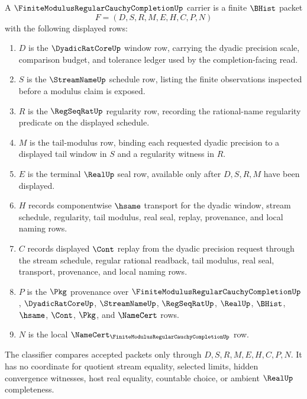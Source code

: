 \begin{definition}
\label{def:finite-modulus-regular-cauchy-completion-carrier}
A $\FiniteModulusRegularCauchyCompletionUp$ carrier is a finite $\BHist$ packet
$$
F=(D,S,R,M,E,H,C,P,N)
$$
with the following displayed rows:
\begin{enumerate}
\item $D$ is the $\DyadicRatCoreUp$ window row, carrying the dyadic precision scale, comparison budget, and tolerance ledger used by the completion-facing read.
\item $S$ is the $\StreamNameUp$ schedule row, listing the finite observations inspected before a modulus claim is exposed.
\item $R$ is the $\RegSeqRatUp$ regularity row, recording the rational-name regularity predicate on the displayed schedule.
\item $M$ is the tail-modulus row, binding each requested dyadic precision to a displayed tail window in $S$ and a regularity witness in $R$.
\item $E$ is the terminal $\RealUp$ seal row, available only after $D,S,R,M$ have been displayed.
\item $H$ records componentwise $\hsame$ transport for the dyadic window, stream schedule, regularity, tail modulus, real seal, replay, provenance, and local naming rows.
\item $C$ records displayed $\Cont$ replay from the dyadic precision request through the stream schedule, regular rational readback, tail modulus, real seal, transport, provenance, and local naming rows.
\item $P$ is the $\Pkg$ provenance over $\FiniteModulusRegularCauchyCompletionUp$, $\DyadicRatCoreUp$, $\StreamNameUp$, $\RegSeqRatUp$, $\RealUp$, $\BHist$, $\hsame$, $\Cont$, $\Pkg$, and $\NameCert$ rows.
\item $N$ is the local $\NameCert_{\FiniteModulusRegularCauchyCompletionUp}$ row.
\end{enumerate}
The classifier compares accepted packets only through $D,S,R,M,E,H,C,P,N$. It has no coordinate for quotient stream equality, selected limits, hidden convergence witnesses, host real equality, countable choice, or ambient $\RealUp$ completeness.
\end{definition}

